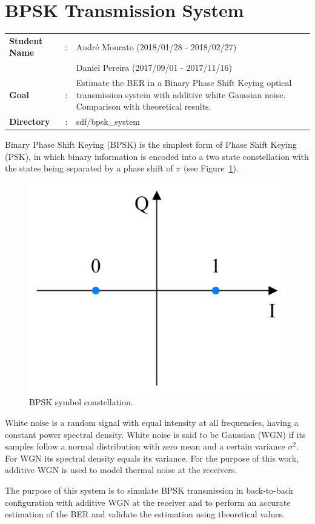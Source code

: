 \clearpage
\section{BPSK Transmission System}

\begin{tcolorbox}	
\begin{tabular}{p{2.75cm} p{0.2cm} p{10.5cm}} 	
\textbf{Student Name}  &:&  Andr\'e Mourato (2018/01/28 - 2018/02/27)\\
\textbf{}  & &  Daniel Pereira (2017/09/01 - 2017/11/16)\\
\textbf{Goal}          &:& Estimate the BER in a Binary Phase Shift Keying optical transmission system with additive white Gaussian noise. Comparison with theoretical results.\\
\textbf{Directory}              &:& sdf/bpsk\_system
\end{tabular}
\end{tcolorbox}

Binary Phase Shift Keying (BPSK) is the simplest form of Phase Shift Keying (PSK), in which binary information is encoded into a two state constellation with the states being separated by a phase shift of $\pi$ (see Figure~\ref{fig:BPSKConst}).

\begin{figure}[h]
\centering
\includegraphics[width=.4\linewidth]{./sdf/bpsk_system/figures/bpskconstellation.jpg}
\caption{BPSK symbol constellation.}
\label{fig:BPSKConst}
\end{figure}

\par
White noise is a random signal with equal intensity at all frequencies, having a constant power spectral density. White noise is said to be Gaussian (WGN) if its samples follow a normal distribution with zero mean and a certain variance $\sigma^2$. For WGN its spectral density equals its variance. For the purpose of this work, additive WGN is used to model thermal noise at the receivers.
\par
The purpose of this system is to simulate BPSK transmission in back-to-back configuration with additive WGN at the receiver and to perform an accurate estimation of the BER and validate the estimation using theoretical values.

